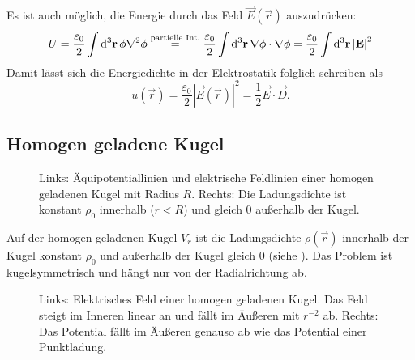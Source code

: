 Es ist auch möglich, die Energie durch das Feld $\vec {E}\left(\vec {r}\right)$ auszudrücken:
\begin{equation*}
	U=\frac{\varepsilon _{0}}{2}\int \diffa[3]{\vec{r}}\phi \nabla ^{2}\phi \overset{\text{partielle Int}.}{=}\frac{\varepsilon _{0}}{2}\int \diffa[3]{\vec{r}}\nabla \phi \cdot \nabla \phi =\frac{\varepsilon _{0}}{2}\int \diffa[3]{\vec{r}}\left| \vec {E}\right| ^{2}
\end{equation*}
Damit lässt sich die Energiedichte in der Elektrostatik folglich schreiben als
\begin{equation*}
	u\left(\vec {r}\right)=\frac{\varepsilon _{0}}{2}\left| \vec {E}\left(\vec {r}\right)\right| ^{2}=\frac{1}{2}\vec {E}\cdot \vec {D}.
\end{equation*}



\subsection{Homogen geladene Kugel}

\begin{figure}[htb]
	\centering
	\tfigEfieldAndPotLinesAndChargeDensitityHomoChargedSphere
	\caption{Links: Äquipotentiallinien und elektrische Feldlinien einer homogen geladenen Kugel mit Radius $R$. Rechts: Die Ladungsdichte ist konstant $\rho_0$ innerhalb ($r<R$) und gleich 0 außerhalb der Kugel. }
	\label{fig:homogenously_charged_ball}
\end{figure}

Auf der homogen geladenen Kugel $V_{r}$ ist die Ladungsdichte $\rho \left(\vec {r}\right)$ innerhalb der Kugel konstant $\rho _{0}$ und außerhalb der Kugel gleich $0$ (siehe ). Das Problem ist kugelsymmetrisch und hängt nur von der Radialrichtung ab.



\begin{figure}[htb]
	\centering
	\tfigEfieldAndPotentialHomoChargedSphere
	\caption{Links: Elektrisches Feld einer homogen geladenen Kugel. Das Feld steigt im Inneren linear an und fällt im Äußeren mit $r^{-2}$ ab. Rechts: Das Potential fällt im Äußeren genauso ab wie das Potential einer Punktladung. }
	\label{fig:homogenously_charged_ball_field_potential}
\end{figure}

